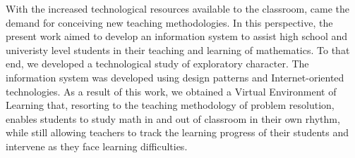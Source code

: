 With the increased technological resources available to the classroom, came the demand for conceiving new teaching methodologies. In this perspective, the present work aimed to develop an information system to assist high school and univeristy level students in their teaching and learning of mathematics. To that end, we developed a technological study of exploratory character. The information system was developed using design patterns and Internet-oriented technologies. As a result of this work, we obtained a Virtual Environment of Learning that, resorting to the teaching methodology of problem resolution, enables students to study math in and out of classroom in their own rhythm, while still allowing teachers to track the learning progress of their students and intervene as they face learning difficulties.


